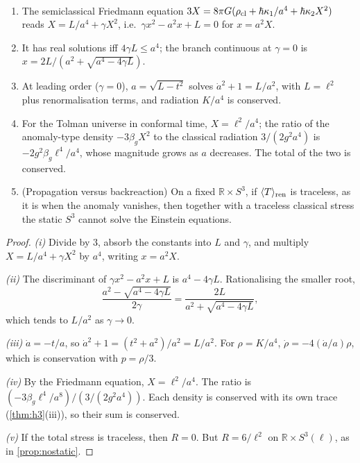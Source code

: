 \begin{theorem}\label{thm:semitolman}\ver\
\begin{enumerate}[label=(\roman*)]
\item The semiclassical Friedmann equation $3X=8\pi G(\rho_{\rm cl}+\hbar\kappa_1/a^4+\hbar\kappa_2X^2)$ reads $X=L/a^4+\gamma X^2$, i.e.\ $\gamma x^2-a^2x+L=0$ for $x=a^2X$.
\item It has real solutions iff $4\gamma L\le a^4$; the branch continuous at $\gamma=0$ is $x=2L/(a^2+\sqrt{a^4-4\gamma L})$.
\item At leading order ($\gamma=0$), $a=\sqrt{L-t^2}$ solves $\dot a^2+1=L/a^2$, with $L=\ell^2$ plus renormalisation terms, and radiation $K/a^4$ is conserved.
\item For the Tolman universe in conformal time, $X=\ell^2/a^4$; the ratio of the anomaly-type density $-3\beta_gX^2$ to the classical radiation $3/(2g^2a^4)$ is $-2g^2\beta_g\ell^4/a^4$, whose magnitude grows as $a$ decreases. The total of the two is conserved.
\item (Propagation versus backreaction) On a fixed $\mathbb R\times S^3$, if $\langle T\rangle_{\rm ren}$ is traceless, as it is when the anomaly vanishes, then together with a traceless classical stress the static $S^3$ cannot solve the Einstein equations.
\end{enumerate}
\end{theorem}
\begin{proof}
\emph{(i)} Divide by $3$, absorb the constants into $L$ and $\gamma$, and multiply $X=L/a^4+\gamma X^2$ by $a^4$, writing $x=a^2X$.

\emph{(ii)} The discriminant of $\gamma x^2-a^2x+L$ is $a^4-4\gamma L$. Rationalising the smaller root,
\[
\frac{a^2-\sqrt{a^4-4\gamma L}}{2\gamma}=\frac{2L}{a^2+\sqrt{a^4-4\gamma L}},
\]
which tends to $L/a^2$ as $\gamma\to0$.

\emph{(iii)} $\dot a=-t/a$, so $\dot a^2+1=(t^2+a^2)/a^2=L/a^2$. For $\rho=K/a^4$, $\dot\rho=-4(\dot a/a)\rho$, which is conservation with $p=\rho/3$.

\emph{(iv)} By the Friedmann equation, $X=\ell^2/a^4$. The ratio is $(-3\beta_g\ell^4/a^8)\big/(3/(2g^2a^4))$. Each density is conserved with its own trace (\cref{thm:h3}(iii)), so their sum is conserved.

\emph{(v)} If the total stress is traceless, then $R=0$. But $R=6/\ell^2$ on $\mathbb R\times S^3(\ell)$, as in \cref{prop:nostatic}.
\end{proof}


